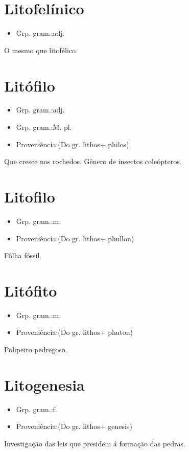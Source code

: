 \section{Litofelínico}
\begin{itemize}
\item {Grp. gram.:adj.}
\end{itemize}
O mesmo que \textunderscore litofélico\textunderscore .
\section{Litófilo}
\begin{itemize}
\item {Grp. gram.:adj.}
\end{itemize}
\begin{itemize}
\item {Grp. gram.:M. pl.}
\end{itemize}
\begin{itemize}
\item {Proveniência:(Do gr. \textunderscore lithos\textunderscore  + \textunderscore philos\textunderscore )}
\end{itemize}
Que cresce nos rochedos.
Gênero de insectos coleópteros.
\section{Litofilo}
\begin{itemize}
\item {Grp. gram.:m.}
\end{itemize}
\begin{itemize}
\item {Proveniência:(Do gr. \textunderscore lithos\textunderscore  + \textunderscore phullon\textunderscore )}
\end{itemize}
Fôlha fóssil.
\section{Litófito}
\begin{itemize}
\item {Grp. gram.:m.}
\end{itemize}
\begin{itemize}
\item {Proveniência:(Do gr. \textunderscore lithos\textunderscore  + \textunderscore phuton\textunderscore )}
\end{itemize}
Polipeiro pedregoso.
\section{Litogenesia}
\begin{itemize}
\item {Grp. gram.:f.}
\end{itemize}
\begin{itemize}
\item {Proveniência:(Do gr. \textunderscore lithos\textunderscore  + \textunderscore genesis\textunderscore )}
\end{itemize}
Investigação das leis que presidem á formação das pedras.
